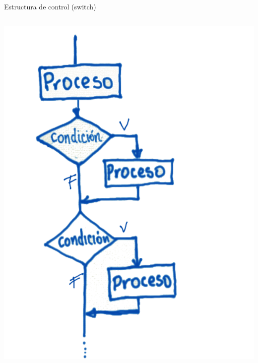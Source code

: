 \documentclass[presentation, aspectratio=54]{beamer}
\begin{document}
\begin{frame}[label={sec:org154be20}]{Estructura de control (switch)}
\begin{columns}
\begin{column}{0.4\columnwidth}
\begin{center}
\includegraphics[width=.9\linewidth]{./images/codigo/ifexcluyentes.png}
\end{center}
\end{column}


\end{columns}
\end{frame}
\end{document}
